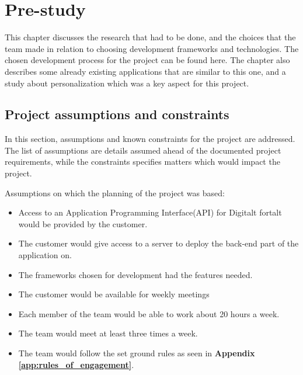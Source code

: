 
\chapter{Pre-study}

This chapter discusses the research that had to be done, and the choices that the team made in relation to choosing development frameworks and technologies. The chosen development process for the project can be found here. The chapter also describes some already existing applications that are similar to this one, and a study about personalization which was a key aspect for this project.

\section{Project assumptions and constraints}
\label{sec:assumptions}

In this section, assumptions and known constraints for the project are addressed. The list of assumptions are details assumed ahead of the documented project requirements, while the constraints specifies matters which would impact the project.\newline

Assumptions on which the planning of the project was based:
\begin{itemize}
	\item Access to an Application Programming Interface(API) for Digitalt fortalt would be provided by the customer.
	\item The customer would give access to a server to deploy the back-end part of the application on.
	\item The frameworks chosen for development had the features needed.
	\item The customer would be available for weekly meetings
	\item Each member of the team would be able to work about 20 hours a week.
	\item The team would meet at least three times a week.
	\item The team would follow the set ground rules as seen in \textbf{Appendix \ref{app:rules_of_engagement}}.
\end{itemize}

